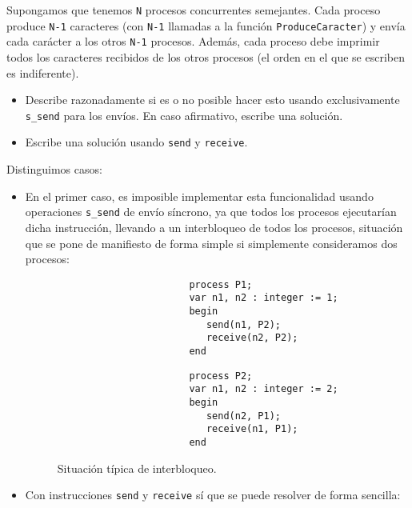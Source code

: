 \begin{ejercicio}\label{ej:rel3_11}
    Supongamos que tenemos \verb|N| procesos concurrentes semejantes.
    Cada proceso produce \verb|N-1| caracteres (con \verb|N-1| llamadas a la función \verb|ProduceCaracter|) y envía cada carácter a los otros \verb|N-1| procesos. Además, cada proceso debe imprimir todos los caracteres recibidos de los otros procesos (el orden en el que se escriben es indiferente).
    \begin{itemize}
        \item Describe razonadamente si es o no posible hacer esto usando exclusivamente \verb|s_send| para los envíos. En caso afirmativo, escribe una solución.
        \item Escribe una solución usando \verb|send| y \verb|receive|.
    \end{itemize}
    Distinguimos casos:
    \begin{itemize}
        \item En el primer caso, es imposible implementar esta funcionalidad usando operaciones \verb|s_send| de envío síncrono, ya que todos los procesos ejecutarían dicha instrucción, llevando a un interbloqueo de todos los procesos, situación que se pone de manifiesto de forma simple si simplemente consideramos dos procesos:
            \begin{figure}[H]
                \setlength{\columnsep}{1cm}
                \begin{multicols}{2}
                    \begin{verbatim}
                       process P1;    
                       var n1, n2 : integer := 1;
                       begin
                          send(n1, P2);
                          receive(n2, P2);
                       end
                    \end{verbatim}
                    \begin{verbatim}
                       process P2;    
                       var n1, n2 : integer := 2;
                       begin
                          send(n2, P1);
                          receive(n1, P1);
                       end
                    \end{verbatim}
                \end{multicols}
                \caption{Situación típica de interbloqueo.}
            \end{figure}
        \item Con instrucciones \verb|send| y \verb|receive| sí que se puede resolver de forma sencilla:

\end{itemize}
\end{ejercicio}
